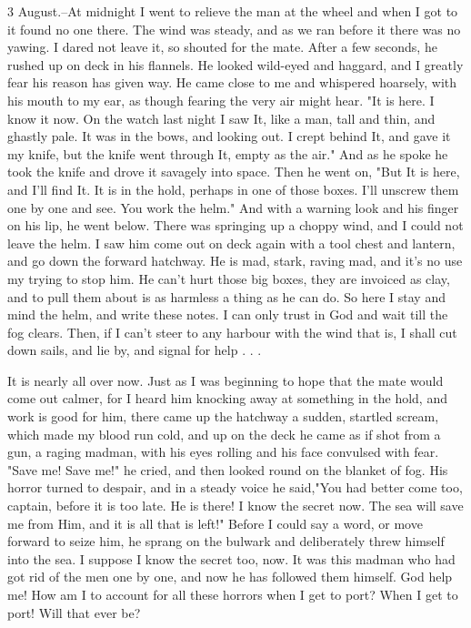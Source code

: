 3 August.--At midnight I went to relieve the man at the wheel and when I got to it found no one there. The wind was steady, and as we ran before it there was no yawing. I dared not leave it, so shouted for the mate. After a few seconds, he rushed up on deck in his flannels. He looked wild-eyed and haggard, and I greatly fear his reason has given way. He came close to me and whispered hoarsely, with his mouth to my ear, as though fearing the very air might hear. "It is here. I know it now. On the watch last night I saw It, like a man, tall and thin, and ghastly pale. It was in the bows, and looking out. I crept behind It, and gave it my knife, but the knife went through It, empty as the air." And as he spoke he took the knife and drove it savagely into space. Then he went on, "But It is here, and I'll find It. It is in the hold, perhaps in one of those boxes. I'll unscrew them one by one and see. You work the helm." And with a warning look and his finger on his lip, he went below. There was springing up a choppy wind, and I could not leave the helm. I saw him come out on deck again with a tool chest and lantern, and go down the forward hatchway. He is mad, stark, raving mad, and it's no use my trying to stop him. He can't hurt those big boxes, they are invoiced as clay, and to pull them about is as harmless a thing as he can do. So here I stay and mind the helm, and write these notes. I can only trust in God and wait till the fog clears. Then, if I can't steer to any harbour with the wind that is, I shall cut down sails, and lie by, and signal for help . . . 

It is nearly all over now. Just as I was beginning to hope that the mate would come out calmer, for I heard him knocking away at something in the hold, and work is good for him, there came up the hatchway a sudden, startled scream, which made my blood run cold, and up on the deck he came as if shot from a gun, a raging madman, with his eyes rolling and his face convulsed with fear. "Save me! Save me!" he cried, and then looked round on the blanket of fog. His horror turned to despair, and in a steady voice he said,"You had better come too, captain, before it is too late. He is there! I know the secret now. The sea will save me from Him, and it is all that is left!" Before I could say a word, or move forward to seize him, he sprang on the bulwark and deliberately threw himself into the sea. I suppose I know the secret too, now. It was this madman who had got rid of the men one by one, and now he has followed them himself. God help me! How am I to account for all these horrors when I get to port? When I get to port! Will that ever be? 

